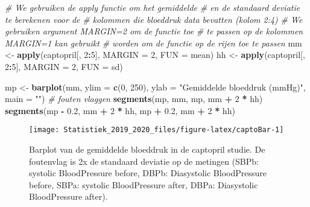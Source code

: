 \documentclass[12pt,dutch,coursenotes]{book}
\newenvironment{Shaded}{\begin{snugshade}}{\end{snugshade}}
\newcommand{\KeywordTok}[1]{\textcolor[rgb]{0.13,0.29,0.53}{\textbf{#1}}}
\newcommand{\DataTypeTok}[1]{\textcolor[rgb]{0.13,0.29,0.53}{#1}}
\newcommand{\DecValTok}[1]{\textcolor[rgb]{0.00,0.00,0.81}{#1}}
\newcommand{\FloatTok}[1]{\textcolor[rgb]{0.00,0.00,0.81}{#1}}
\newcommand{\StringTok}[1]{\textcolor[rgb]{0.31,0.60,0.02}{#1}}
\newcommand{\CommentTok}[1]{\textcolor[rgb]{0.56,0.35,0.01}{\textit{#1}}}
\newcommand{\OperatorTok}[1]{\textcolor[rgb]{0.81,0.36,0.00}{\textbf{#1}}}
\newcommand{\NormalTok}[1]{#1}
\theoremstyle{definition}
\theoremstyle{definition}
\theoremstyle{definition}
\theoremstyle{remark}
\begin{document}
\begin{Shaded}
\begin{Highlighting}[]
\CommentTok{# We gebruiken de apply functie om het gemiddelde}
\CommentTok{# en de standaard deviatie te berekenen voor de}
\CommentTok{# kolommen die bloeddruk data bevatten (kolom 2:4)}
\CommentTok{# We gebruiken argument MARGIN=2 om de functie toe}
\CommentTok{# te passen op de kolommen MARGIN=1 kan gebruikt}
\CommentTok{# worden om de functie op de rijen toe te passen}
\NormalTok{mm <-}\StringTok{ }\KeywordTok{apply}\NormalTok{(captopril[, }\DecValTok{2}\OperatorTok{:}\DecValTok{5}\NormalTok{], }\DataTypeTok{MARGIN =} \DecValTok{2}\NormalTok{, }\DataTypeTok{FUN =}\NormalTok{ mean)}
\NormalTok{hh <-}\StringTok{ }\KeywordTok{apply}\NormalTok{(captopril[, }\DecValTok{2}\OperatorTok{:}\DecValTok{5}\NormalTok{], }\DataTypeTok{MARGIN =} \DecValTok{2}\NormalTok{, }\DataTypeTok{FUN =}\NormalTok{ sd)}

\NormalTok{mp <-}\StringTok{ }\KeywordTok{barplot}\NormalTok{(mm, }\DataTypeTok{ylim =} \KeywordTok{c}\NormalTok{(}\DecValTok{0}\NormalTok{, }\DecValTok{250}\NormalTok{), }\DataTypeTok{ylab =} \StringTok{"Gemiddelde bloeddruk (mmHg)"}\NormalTok{, }
    \DataTypeTok{main =} \StringTok{""}\NormalTok{)}
\CommentTok{# fouten vlaggen}
\KeywordTok{segments}\NormalTok{(mp, mm, mp, mm }\OperatorTok{+}\StringTok{ }\DecValTok{2} \OperatorTok{*}\StringTok{ }\NormalTok{hh)}
\KeywordTok{segments}\NormalTok{(mp }\OperatorTok{-}\StringTok{ }\FloatTok{0.2}\NormalTok{, mm }\OperatorTok{+}\StringTok{ }\DecValTok{2} \OperatorTok{*}\StringTok{ }\NormalTok{hh, mp }\OperatorTok{+}\StringTok{ }\FloatTok{0.2}\NormalTok{, mm }\OperatorTok{+}\StringTok{ }\DecValTok{2} \OperatorTok{*}\StringTok{ }
\StringTok{    }\NormalTok{hh)}
\end{Highlighting}
\end{Shaded}

\begin{figure}

{\centering \texttt{[image: Statistiek\_2019\_2020\_files/figure-latex/captoBar-1]} 

}

\caption{Barplot van de gemiddelde bloeddruk in de captopril studie. De foutenvlag is 2x de standaard deviatie op de metingen (SBPb: systolic BloodPressure before, DBPb: Diasystolic BloodPressure before, SBPa: systolic BloodPressure after, DBPa: Diasystolic BloodPressure after).}\label{fig:captoBar}
\end{figure}
\end{document}
